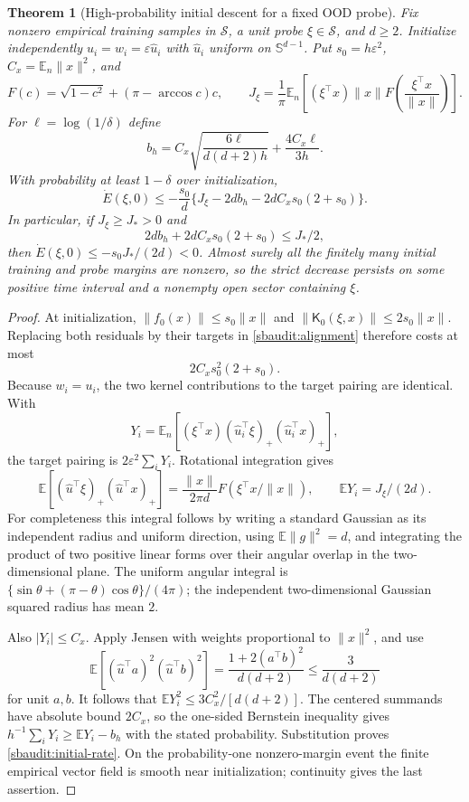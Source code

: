 \documentclass{article} %
\theoremstyle{plain}
\newtheorem{theorem}{Theorem}[section]
\theoremstyle{definition}
\theoremstyle{remark}
\begin{document}
\begin{theorem}[High-probability initial descent for a fixed OOD probe]
\label{sbaudit:initial-descent}
Fix nonzero empirical training samples in $\mathcal S$, a unit probe
$\xi\in\mathcal S$, and $d\ge2$. Initialize independently
$u_i=w_i=\varepsilon\widehat u_i$ with $\widehat u_i$ uniform on
$\mathbb S^{d-1}$. Put $s_0=h\varepsilon^2$,
$C_x=\mathbb E_n\|x\|^2$, and
\[
 F(c)=\sqrt{1-c^2}+(\pi-\arccos c)c,\qquad
 J_\xi=\frac1\pi\mathbb E_n\left[
 (\xi^\top x)\|x\| F\left(\frac{\xi^\top x}{\|x\|}\right)\right].
\]
For $\ell=\log(1/\delta)$ define
\[
 b_h=C_x\sqrt{\frac{6\ell}{d(d+2)h}}+
                 \frac{4C_x\ell}{3h}.
\]
With probability at least $1-\delta$ over initialization,
\begin{equation}\label{sbaudit:initial-rate}
 \dot E(\xi,0)\le-\frac{s_0}{d}
 \{J_\xi-2db_h-2dC_xs_0(2+s_0)\}.
\end{equation}
In particular, if $J_\xi\ge J_*>0$ and
\begin{equation}\label{sbaudit:initial-budget}
 2db_h+2dC_xs_0(2+s_0)\le J_*/2,
\end{equation}
then $\dot E(\xi,0)\le-s_0J_*/(2d)<0$. Almost surely all the finitely
many initial training and probe margins are nonzero, so the strict
decrease persists on some positive time interval and a nonempty open
sector containing $\xi$.
\end{theorem}
\begin{proof}
At initialization, $\|f_0(x)\|\le s_0\|x\|$ and
$\|\mathsf K_0(\xi,x)\|\le2s_0\|x\|$. Replacing both residuals by
their targets in \eqref{sbaudit:alignment} therefore costs at most
\[
 2C_xs_0^2(2+s_0).
\]
Because $w_i=u_i$, the two kernel contributions to the target pairing
are identical. With
\[
 Y_i=\mathbb E_n[(\xi^\top x)(\widehat u_i^\top\xi)_+
                                      (\widehat u_i^\top x)_+],
\]
the target pairing is $2\varepsilon^2\sum_iY_i$.
Rotational integration gives
\[
 \mathbb E[(\widehat u^\top\xi)_+(\widehat u^\top x)_+]
 =\frac{\|x\|}{2\pi d}F(\xi^\top x/\|x\|),
 \qquad \mathbb EY_i=J_\xi/(2d).
\]
For completeness this integral follows by writing a standard Gaussian
as its independent radius and uniform direction, using
$\mathbb E\|g\|^2=d$, and integrating the product of two positive
linear forms over their angular overlap in the two-dimensional plane.
The uniform angular integral is
$\{\sin\theta+(\pi-\theta)\cos\theta\}/(4\pi)$; the independent
two-dimensional Gaussian squared radius has mean $2$.

Also $|Y_i|\le C_x$. Apply Jensen with weights proportional to
$\|x\|^2$, and use
\[
 \mathbb E[(\widehat u^\top a)^2(\widehat u^\top b)^2]
 =\frac{1+2(a^\top b)^2}{d(d+2)}\le\frac3{d(d+2)}
\]
for unit $a,b$. It follows that
$\mathbb EY_i^2\le3C_x^2/[d(d+2)]$.
The centered summands have absolute bound $2C_x$, so the one-sided
Bernstein inequality gives $h^{-1}\sum_iY_i\ge\mathbb EY_i-b_h$
with the stated probability. Substitution proves
\eqref{sbaudit:initial-rate}. On the probability-one nonzero-margin
event the finite empirical vector field is smooth near initialization;
continuity gives the last assertion.
\end{proof}
\end{document}
